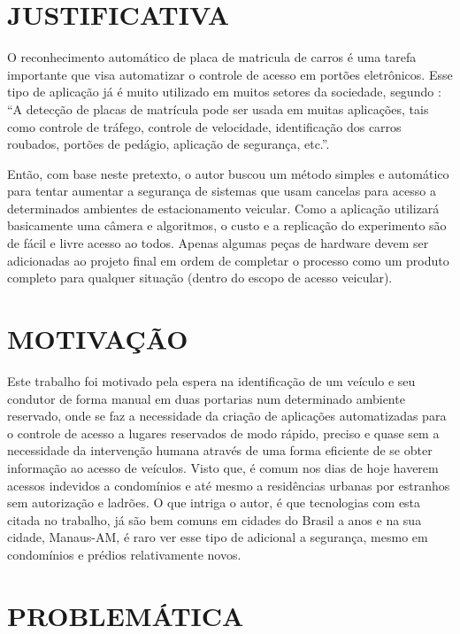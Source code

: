 \section{\uppercase{Justificativa}}

O reconhecimento automático de placa de matricula de carros é uma tarefa importante que visa automatizar o controle de acesso em portões eletrônicos. Esse tipo de aplicação já é muito utilizado em muitos setores da sociedade, segundo : ``A detecção de placas de matrícula pode ser usada em muitas aplicações, tais como controle de tráfego, controle de velocidade, identificação dos carros roubados, portões de pedágio, aplicação de segurança, etc.''.

Então, com base neste pretexto, o autor buscou um método simples e automático para tentar aumentar a segurança de sistemas que usam cancelas para acesso a determinados ambientes de estacionamento veicular. Como a aplicação utilizará basicamente uma câmera e algoritmos, o custo e a replicação do experimento são de fácil e livre acesso ao todos. Apenas algumas peças de hardware devem ser adicionadas ao projeto final em ordem de completar o processo como um produto completo para qualquer situação (dentro do escopo de acesso veicular).

\section{\uppercase{Motivação}}

Este trabalho foi motivado pela espera na identificação de um veículo e seu condutor de forma manual em duas portarias num determinado ambiente reservado, onde se faz a necessidade da criação de aplicações automatizadas para o controle de acesso a lugares reservados de modo rápido, preciso e quase sem a necessidade da intervenção humana através de uma forma eficiente de se obter informação ao acesso de veículos. Visto que, é comum nos dias de hoje haverem acessos indevidos a condomínios e até mesmo a residências urbanas por estranhos sem autorização e ladrões. O que intriga o autor, é que tecnologias com esta citada no trabalho, já são bem comuns em cidades do Brasil a anos e na sua cidade, Manaus-AM, é raro ver esse tipo de adicional a segurança, mesmo em condomínios e prédios relativamente novos.

\section{\uppercase{Problemática}}

